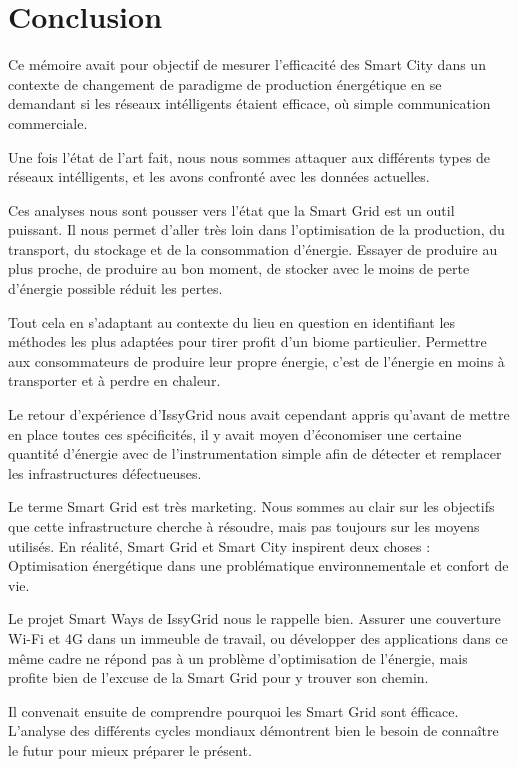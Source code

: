 \chapter*{Conclusion}

Ce mémoire avait pour objectif de mesurer l'efficacité des Smart City dans un contexte de changement
de paradigme de production énergétique en se demandant si les réseaux intélligents étaient efficace,
où simple communication commerciale.

Une fois l'état de l'art fait, nous nous sommes attaquer aux différents types de réseaux intélligents,
et les avons confronté avec les données actuelles.

Ces analyses nous sont pousser vers l'état que la Smart Grid est un outil puissant.
Il nous permet d'aller très loin dans l'optimisation de la production, du transport,
du stockage et de la consommation d'énergie.
Essayer de produire au plus proche, de produire au bon moment, de stocker avec le moins de perte d'énergie possible
réduit les pertes.

Tout cela en s'adaptant au contexte du lieu en question en identifiant les méthodes
les plus adaptées pour tirer profit d'un biome particulier.
Permettre aux consommateurs de produire leur propre énergie, c'est de l'énergie en moins à transporter et à perdre en chaleur.

Le retour d'expérience d'IssyGrid nous avait cependant appris qu'avant de mettre en place toutes ces spécificités,
il y avait moyen d'économiser une certaine quantité d'énergie avec de l'instrumentation
simple afin de détecter et remplacer les infrastructures défectueuses.

Le terme Smart Grid est très marketing.
Nous sommes au clair sur les objectifs que cette infrastructure cherche à résoudre, mais pas toujours sur les moyens utilisés.
En réalité, Smart Grid et Smart City inspirent deux choses :
Optimisation énergétique dans une problématique environnementale et confort de vie.

Le projet Smart Ways de IssyGrid nous le rappelle bien.
Assurer une couverture Wi-Fi et 4G dans un immeuble de travail,
ou développer des applications dans ce même cadre ne répond pas à un problème
d’optimisation de l'énergie, mais profite bien de l’excuse de la Smart Grid pour y trouver son chemin.

Il convenait ensuite de comprendre pourquoi les Smart Grid sont éfficace.
L'analyse des différents cycles mondiaux démontrent bien le besoin de connaître le futur pour
mieux préparer le présent.

